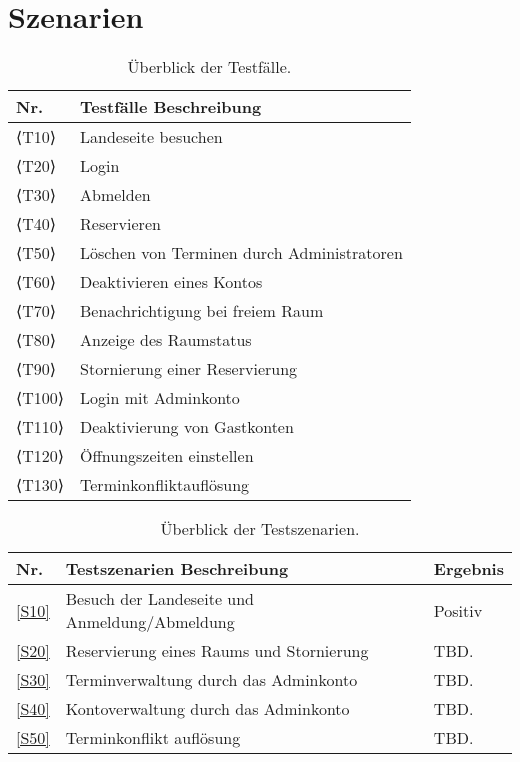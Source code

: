 
\chapter{Szenarien}
\label{ch:scenarios}

\begin{table}[htbp]
    \centering
    \begin{tabularx}{\textwidth}{ l|X }
        \textbf{Nr.} & \textbf{Testfälle Beschreibung} \\ \hline\hline
        ⟨T10⟩ & Landeseite besuchen \\
        ⟨T20⟩ & Login \\
        ⟨T30⟩ & Abmelden \\
        ⟨T40⟩ & Reservieren \\
        ⟨T50⟩ & Löschen von Terminen durch Administratoren \\
        ⟨T60⟩ & Deaktivieren eines Kontos \\
        ⟨T70⟩ & Benachrichtigung bei freiem Raum \\
        ⟨T80⟩ & Anzeige des Raumstatus \\
        ⟨T90⟩ & Stornierung einer Reservierung \\
        ⟨T100⟩ & Login mit Adminkonto \\
        ⟨T110⟩ & Deaktivierung von Gastkonten \\
        ⟨T120⟩ & Öffnungszeiten einstellen \\
        ⟨T130⟩ & Terminkonfliktauflösung \\
    \end{tabularx}
    \caption{Überblick der Testfälle.}
    \label{tab:test_table}
\end{table}

\begin{table}[htbp]
    \centering
    \begin{tabularx}{\textwidth}{ l|X|l }
        \textbf{Nr.} & \textbf{Testszenarien Beschreibung} & \textbf{Ergebnis} \\ \hline\hline
        \ref{S10} & Besuch der Landeseite und Anmeldung/Abmeldung & Positiv\\
        \ref{S20} & Reservierung eines Raums und Stornierung & TBD.\\
        \ref{S30} & Terminverwaltung durch das Adminkonto & TBD.\\
        \ref{S40} & Kontoverwaltung durch das Adminkonto & TBD.\\
        \ref{S50} & Terminkonflikt auflösung & TBD.\\
    \end{tabularx}
    \caption{Überblick der Testszenarien.}
    \label{tab:scenario_table}
\end{table}

